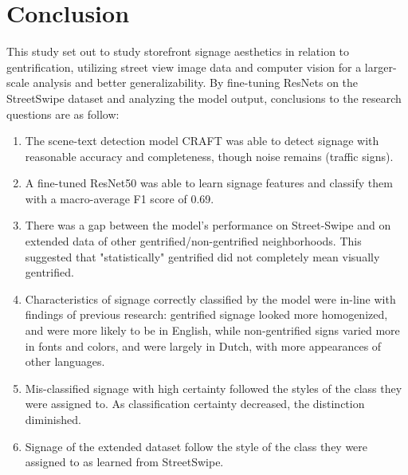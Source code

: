 \section{Conclusion}
\label{sec:conclusion}

This study set out to study storefront signage aesthetics in relation to gentrification, utilizing street view image data and computer vision for a larger-scale analysis and better generalizability. By fine-tuning ResNets on 
the StreetSwipe dataset and analyzing the model output, conclusions to the research questions are as follow:

\begin{enumerate}
    \item The scene-text detection model CRAFT was able to detect signage with reasonable accuracy and completeness, though noise remains (traffic signs).
    
    \item A fine-tuned ResNet50 was able to learn signage features and classify them with a macro-average F1 score of 0.69.
    
    \item There was a gap between the model's performance on Street-Swipe and on extended data of other gentrified/non-gentrified neighborhoods. This suggested that "statistically" gentrified did not completely mean visually gentrified. 
    
    \item Characteristics of signage correctly classified by the model were in-line with findings of previous research: gentrified signage looked more homogenized, and were more likely to be in English, while non-gentrified signs varied more in fonts and colors, and were largely in Dutch, with more appearances of other languages.
    
    \item Mis-classified signage with high certainty followed the styles of the class they were assigned to. As classification certainty decreased, the distinction diminished.
    
    \item Signage of the extended dataset follow the style of the class they were assigned to as learned from StreetSwipe.
\end{enumerate}

